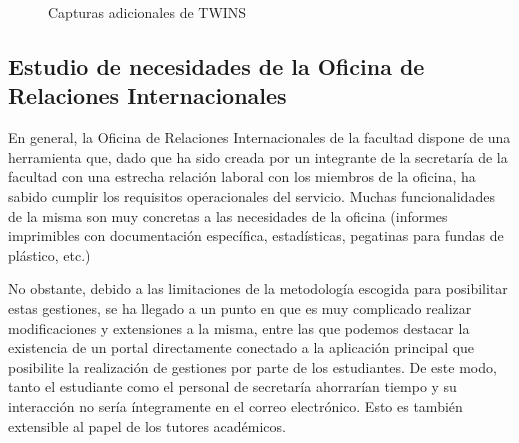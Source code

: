 \begin{figure}
	\ContinuedFloat

\label{fig:adicionales}
\caption{Capturas adicionales de TWINS}

\end{figure}

\subsection{Estudio de necesidades de la Oficina de Relaciones Internacionales}

En general, la Oficina de Relaciones Internacionales de la facultad dispone de una herramienta que, dado que ha sido creada por un integrante de la secretaría de la facultad con una estrecha relación laboral con los miembros de la oficina, ha sabido cumplir los requisitos  operacionales del servicio. Muchas funcionalidades de la misma son muy concretas a las necesidades de la oficina (informes imprimibles con documentación específica, estadísticas, pegatinas para fundas de plástico, etc.)

No obstante, debido a las limitaciones de la metodología escogida para posibilitar estas gestiones, se ha llegado a un punto en que es muy complicado realizar modificaciones y extensiones a la misma, entre las que podemos destacar la existencia de un portal directamente conectado a la aplicación principal que posibilite la realización de gestiones por parte de los estudiantes. De este modo, tanto el estudiante como el personal de secretaría ahorrarían tiempo y su interacción no sería íntegramente en el correo electrónico. Esto es también extensible al papel de los tutores académicos.

